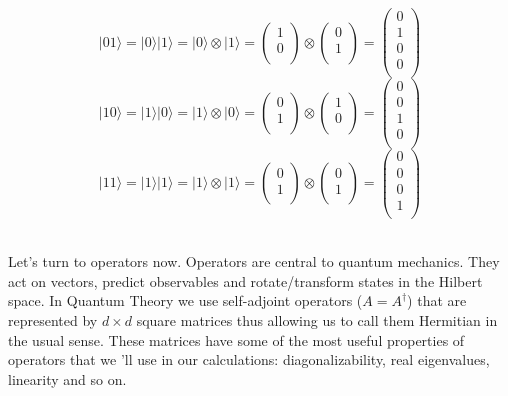 $$
|01 \rangle=|0\rangle|1\rangle=|0\rangle \otimes |1\rangle=
\left(\begin{array}{c}
1\\
0\\
\end{array}
\right)
\otimes
\left( 
\begin{array}{c}
0\\
1\\
\end{array}
\right)=\left(\begin{array}{c}
0 \\
1\\
0\\
0\\
\end{array}\right)
$$
$$
|10 \rangle=|1\rangle|0\rangle=|1\rangle \otimes |0\rangle=
\left(\begin{array}{c}
0\\
1\\
\end{array}
\right)
\otimes
\left( 
\begin{array}{c}
1\\
0\\
\end{array}
\right)=\left(\begin{array}{c}
0 \\
0\\
1\\
0\\
\end{array}\right)
$$
$$
|11 \rangle=|1\rangle|1\rangle=|1\rangle \otimes |1\rangle=
\left(\begin{array}{c}
0\\
1\\
\end{array}
\right)
\otimes
\left( 
\begin{array}{c}
0\\
1\\
\end{array}
\right)=\left(\begin{array}{c}
0\\
0\\
0\\
1\\
\end{array}\right)
$$
\\
\par
Let's turn to operators now. Operators
are central to quantum mechanics. They act on vectors, predict observables and rotate/transform states in the Hilbert space. In Quantum Theory we use self-adjoint operators ($A=A^{\dagger}$) that are represented by $d \times d$ square matrices thus allowing us to call them Hermitian in the usual sense. These matrices have some of the most useful properties of operators that we 'll use in our calculations: diagonalizability, real eigenvalues, linearity and so on.
